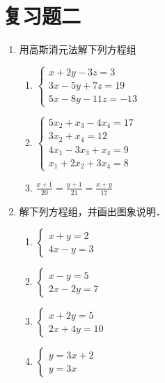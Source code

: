 \section*{复习题二}
\begin{enumerate}
    \item 用高斯消元法解下列方程组

    \begin{multicols}{2}
        \begin{enumerate}
        \item $\begin{cases}
            x+2y-3z=3\\3x-5y+7z=19\\5x-8y-11z=-13
        \end{cases}$
        \item $\begin{cases}
            5x_2+x_3-4x_4=17\\3x_2+x_4=12\\
            4x_1-3x_3+x_4=9\\ x_1+2x_2+3x_4=8
        \end{cases}$
        \item $\frac{x+1}{20}=\frac{y+1}{21}=\frac{x+y}{17}$
    \end{enumerate}
    \end{multicols}
    
    
    \item 解下列方程组，并画出图象说明．
    \begin{multicols}{2}
    \begin{enumerate}
        \item $\begin{cases}
            x+y=2\\4x-y=3
        \end{cases}$
        \item $\begin{cases}
            x-y=5\\2x-2y=7
        \end{cases}$
        \item $\begin{cases}
            x+2y=5\\2x+4y=10
        \end{cases}$
        \item $\begin{cases}
            y=3x+2\\y=3x
        \end{cases}$
    \end{enumerate}
    \end{multicols}


\end{enumerate}
